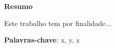\begin{center}

\huge
\textbf{Resumo}

\end{center}

Este trabalho tem por finalidade...
    
\vspace{\onelineskip}

\noindent

\textbf{Palavras-chave}: x, y, z
